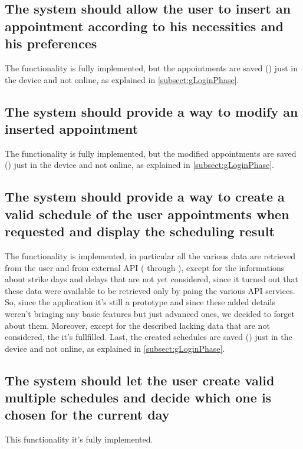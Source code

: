 \subsection{The system should allow the user to insert an appointment according to his necessities and his preferences} \label{subsect:gAppointmentCreation}
The functionality is fully implemented, but the appointments are saved () just in the device and not online, as explained in \ref{subsect:gLoginPhase}.

\subsection{The system should provide a way to modify an inserted appointment} \label{subsect:gAppointmentModification}
The functionality is fully implemented, but the modified appointments are saved () just in the device and not online, as explained in \ref{subsect:gLoginPhase}.

\subsection{The system should provide a way to create a valid schedule of the user appointments when requested and display the scheduling result}
\label{subsect:gScheduleCreation}
The functionality is implemented, in particular all the various data are retrieved from the user and from external API ( through ), except for the informations about strike days and delays that are not yet considered, since it turned out that these data were available to be retrieved only by paing the various API services. So, since the application it's still a prototype and since these added details weren't bringing any basic features but just advanced ones, we decided to forget about them. Moreover, except for the described lacking data that are not considered, the  it's fullfilled. Last, the created schedules are saved () just in the device and not online, as explained in \ref{subsect:gLoginPhase}.

\subsection{The system should let the user create valid multiple schedules and decide which one is chosen for the current day} \label{subsect:gScheduleSelection}
This functionality it's fully implemented.

